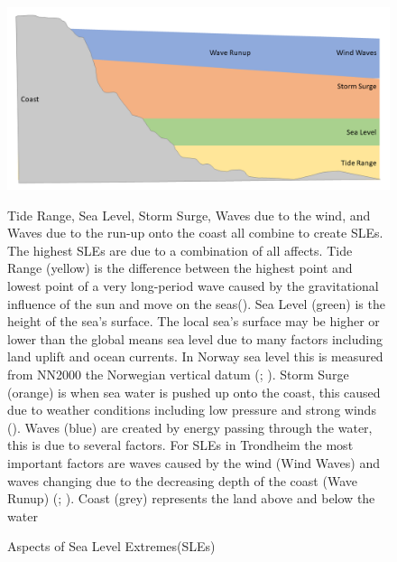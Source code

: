 \begin{figure}[h!]
    \centering
    \includegraphics[width=1\textwidth]{fig_theory/sea level extremes.png}
    \caption{Aspects of Sea Level Extremes(SLEs)}{ Tide Range, Sea Level, Storm Surge, Waves due to the wind, and Waves due to the run-up onto the coast all combine to create SLEs. The highest SLEs are due to a combination of all affects. Tide Range (yellow) is the difference between the highest point and lowest point of a very long-period wave caused by the gravitational influence of the sun and move on the seas(\cite{noaa_what_2023-1}). Sea Level (green) is the height of the sea's surface. The local sea's surface may be higher or lower than the global means sea level due to many factors including land uplift and ocean currents. In Norway sea level this is measured from NN2000 the Norwegian vertical datum (\cite{noaa_what_2023}; \cite{kartverket_high_2022}). Storm Surge (orange) is when sea water is pushed up onto the coast, this caused due to weather conditions including low pressure and strong winds (\cite{dsb_integrating-sea-level-rise-and-storm-surges--local-planningpdf_2017}). Waves (blue) are created by energy passing through the water, this is due to several factors. For SLEs in Trondheim the most important factors are waves caused by the wind (Wind Waves) and waves changing due to the decreasing depth of the coast (Wave Runup) (\cite{dsb_integrating-sea-level-rise-and-storm-surges--local-planningpdf_2017}; \cite{noaa_what_2023}). Coast (grey) represents the land above and below the water
    }

    \label{fig:theory_SLE_cause}
\end{figure}

